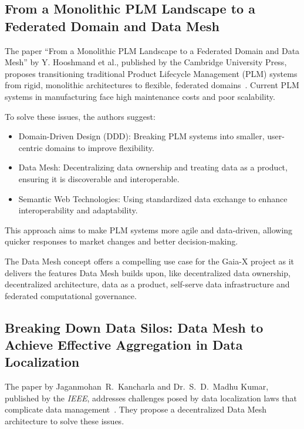 \subsection{From a Monolithic PLM Landscape to a Federated Domain and Data Mesh}\label{subsec:from-a-monolithic-plm-landscape-to-a-federated-domain-and-data-mesh}

The paper ``From a Monolithic PLM Landscape to a Federated Domain and Data Mesh'' by Y. Hooshmand et al., published by the Cambridge University Press, proposes transitioning traditional Product Lifecycle Management (PLM) systems from rigid, monolithic architectures to flexible, federated domains~\cite{from_monolithic_plm_to_federated}.
Current PLM systems in manufacturing face high maintenance costs and poor scalability.

To solve these issues, the authors suggest:
\begin{itemize}
    \item Domain-Driven Design (DDD): Breaking PLM systems into smaller, user-centric domains to improve flexibility.
    \item Data Mesh: Decentralizing data ownership and treating data as a product, ensuring it is discoverable and interoperable.
    \item Semantic Web Technologies: Using standardized data exchange to enhance interoperability and adaptability.
\end{itemize}

This approach aims to make PLM systems more agile and data-driven, allowing quicker responses to market changes and better decision-making.

The Data Mesh concept offers a compelling use case for the Gaia-X project as it delivers the features Data Mesh builds upon, like decentralized data ownership, decentralized architecture, data as a product, self-serve data infrastructure and federated computational governance.

\subsection{Breaking Down Data Silos: Data Mesh to Achieve Effective Aggregation in Data Localization}\label{subsec:breaking-down-data-silos:-data-mesh-to-achieve-effective-aggregation-in-data-localization}

The paper by Jaganmohan~R.~Kancharla and Dr.~S.~D.~Madhu Kumar, published by the \textit{IEEE}, addresses challenges posed by data localization laws that complicate data management~\cite{breaking_down_data_silos}.
They propose a decentralized Data Mesh architecture to solve these issues.

